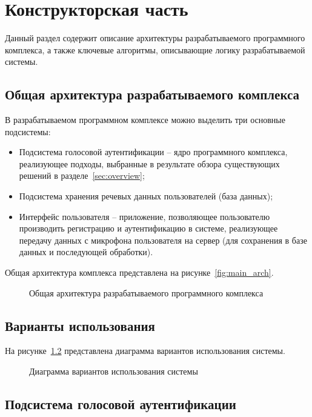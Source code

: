 \chapter{Конструкторская часть}
Данный раздел содержит описание архитектуры разрабатываемого программного комплекса, а также ключевые алгоритмы, описывающие логику разрабатываемой системы.

\section{Общая архитектура разрабатываемого комплекса}
\label{sec:main_arch}

В разрабатываемом программном комплексе можно выделить три основные подсистемы:
\begin{itemize}
\item Подсистема голосовой аутентификации -- ядро программного комплекса, реализующее подходы, выбранные в результате обзора существующих решений в разделе~\ref{sec:overview};
\item Подсистема хранения речевых данных пользователей (база данных);
\item Интерфейс пользователя -- приложение, позволяющее пользователю производить регистрацию и аутентификацию в системе, реализующее передачу данных с микрофона пользователя на сервер (для сохранения в базе данных и последующей обработки).
\end{itemize}

Общая архитектура комплекса представлена на рисунке~\ref{fig:main_arch}.

\begin{figure}
    \caption{Общая архитектура разрабатываемого программного комплекса}
    \label{fig:}
\end{figure}

\section{Варианты использования}

На рисунке~\ref{fig:use_cases} представлена диаграмма вариантов использования системы.

\begin{figure}[htp!]
    \caption{Диаграмма вариантов использования системы}
    \label{fig:use_cases}
\end{figure}

\section{Подсистема голосовой аутентификации}

